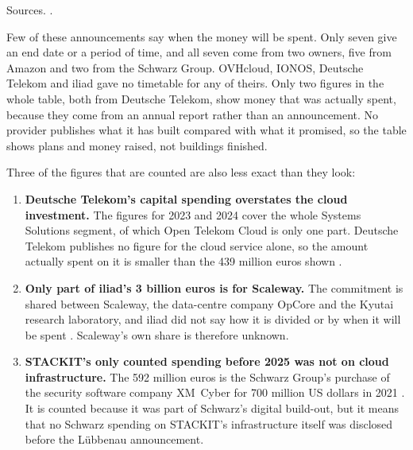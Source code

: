 \begin{table}[htbp]
  \vspace{4pt}
  {\footnotesize\raggedright
  Sources. \cite{AWS_SovereignCloud_Investment_2024,AWS_Frankfurt_Investment_2024,%
  Amazon_Spain_Investment_2026,OVHcloud_IPO,OVHcloud_RegDoc_2021,OVHcloud_URD_2025,%
  IONOS_AR_2025,UnitedInternet_AR_2025,IPCEI_CIS_2023,DT_AR_2025,%
  Iliad_AIInvestment_2025,Schwarz_XMCyber_2021,SchwarzDigits_Luebbenau_2025,%
  SchwarzDigits_Dummerstorf_2026}.\par}
\end{table}

Few of these announcements say when the money will be spent. Only seven give an
end date or a period of time, and all seven come from two owners, five from Amazon
and two from the Schwarz Group. OVHcloud, IONOS, Deutsche Telekom and iliad gave no
timetable for any of theirs. Only two figures in the whole table, both from Deutsche
Telekom, show money that was actually spent, because they come from an annual
report rather than an announcement. No provider publishes what it has built
compared with what it promised, so the table shows plans and money raised, not
buildings finished.

Three of the figures that are counted are also less exact than they look:

\begin{enumerate}
  \item \textbf{Deutsche Telekom's capital spending overstates the cloud
  investment.} The figures for 2023 and 2024 cover the whole Systems Solutions
  segment, of which Open Telekom Cloud is only one part. Deutsche Telekom
  publishes no figure for the cloud service alone, so the amount actually spent
  on it is smaller than the 439 million euros shown \cite{DT_AR_2025}.

  \item \textbf{Only part of iliad's 3 billion euros is for Scaleway.} The
  commitment is shared between Scaleway, the data-centre company OpCore and the
  Kyutai research laboratory, and iliad did not say how it is divided or by when
  it will be spent \cite{Iliad_AIInvestment_2025}. Scaleway's own share is
  therefore unknown.

  \item \textbf{STACKIT's only counted spending before 2025 was not on cloud
  infrastructure.} The 592 million euros is the Schwarz Group's purchase of the
  security software company XM~Cyber for 700 million US dollars in 2021
  \cite{Schwarz_XMCyber_2021}. It is counted because it was part of Schwarz's
  digital build-out, but it means that no Schwarz spending on STACKIT's
  infrastructure itself was disclosed before the L\"ubbenau announcement.
\end{enumerate}

